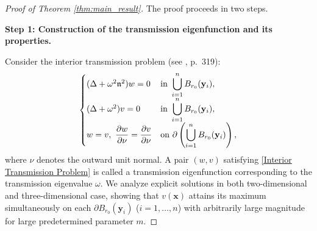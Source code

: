 \documentclass[11pt,reqno,oneside]{amsart}
\numberwithin{equation}{section}
\theoremstyle{definition}
\theoremstyle{remark}
\numberwithin{equation}{section}
\begin{document}
	\begin{proof}[Proof of Theorem \ref{thm:main_result}]
		The proof proceeds in two steps.
		
		\medskip
		\textbf{Step 1: Construction of the transmission eigenfunction and its properties.}
		
		Consider the interior transmission problem (see \cite{ColtonKress}, p.~319):
		\begin{equation}\label{Interior Transmission Problem}
			\left\{\begin{array}{@{}ll@{}}
				(\Delta + \omega^2 \mathfrak{n}^2) w = 0 & \text{in } \displaystyle\bigcup_{i=1}^{n} B_{r_0}(\mathbf{y}_i), \\
				(\Delta + \omega^2) v = 0 & \text{in } \displaystyle\bigcup_{i=1}^{n} B_{r_0}(\mathbf{y}_i), \\
				w = v,\ \dfrac{\partial w}{\partial \nu} = \dfrac{\partial v}{\partial \nu} & \text{on } \partial\left(\displaystyle\bigcup_{i=1}^{n} B_{r_0}(\mathbf{y}_i)\right),
			\end{array}\right.
		\end{equation}
		where $\nu$ denotes the outward unit normal. A pair $(w,v)$ satisfying \eqref{Interior Transmission Problem} is called a transmission eigenfunction corresponding to the transmission eigenvalue $\omega$. We analyze explicit solutions in both two-dimensional  and three-dimensional case, showing that $v(\mathbf{x})$ attains its maximum simultaneously on each $\partial B_{r_0}(\mathbf{y}_i)$ ($i=1,\dots,n$) with arbitrarily large magnitude for large predetermined parameter $m$.
		

\end{proof}
\end{document}
